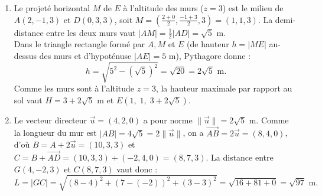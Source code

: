 \begin{exemple}
\begin{enumerate}[label=(\alph*)]
\[    \]
    \item Le projeté horizontal $M$ de $E$ à l'altitude des murs ($z=3$) est le milieu de $A(2,-1,3)$ et $D(0,3,3)$, soit $M = \left(\frac{2+0}{2}, \frac{-1+3}{2}, 3\right) = (1, 1, 3)$. La demi-distance entre les deux murs vaut $|AM| = \frac{1}{2}|AD| = \sqrt{5}\text{ m}$.\\
    Dans le triangle rectangle formé par $A, M$ et $E$ (de hauteur $h = |ME|$ au-dessus des murs et d'hypoténuse $|AE| = 5\text{ m}$), Pythagore donne :
    \[
        h = \sqrt{5^2 - (\sqrt{5})^2} = \sqrt{20} = 2\sqrt{5}\text{ m}.
    \]
    Comme les murs sont à l'altitude $z=3$, la hauteur maximale par rapport au sol vaut $H = \boxed{3 + 2\sqrt{5}\text{ m}}$ et $\boxed{E(1,\; 1,\; 3 + 2\sqrt{5})}$.
    \item Le vecteur directeur $\vec{u} = (4, 2, 0)$ a pour norme $\|\vec{u}\| = 2\sqrt{5}\text{ m}$. Comme la longueur du mur est $|AB| = 4\sqrt{5} = 2\|\vec{u}\|$, on a $\overrightarrow{AB} = 2\vec{u} = (8, 4, 0)$, d'où $B = A + 2\vec{u} = (10, 3, 3)$ et $C = B + \overrightarrow{AD} = (10, 3, 3) + (-2, 4, 0) = (8, 7, 3)$. La distance entre $G(4, -2, 3)$ et $C(8, 7, 3)$ vaut donc :
    \[
        L = |GC| = \sqrt{(8-4)^2 + (7 - (-2))^2 + (3-3)^2} = \sqrt{16 + 81 + 0} = \boxed{\sqrt{97}\text{ m}}.
    \]
\end{enumerate}


\end{exemple}
